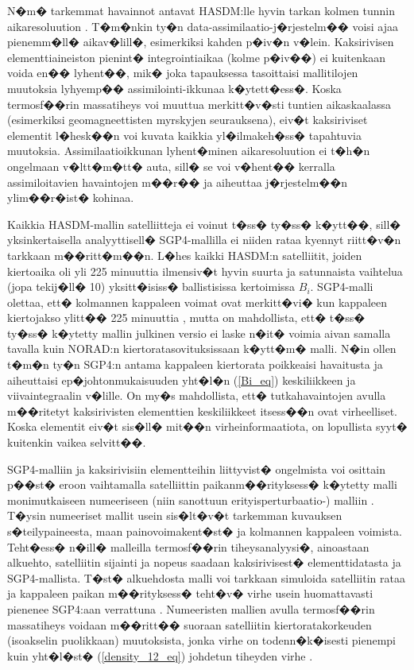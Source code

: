 \documentclass[12pt,a4paper,finnish,margin=2in]{article}
\begin{document}
N�m� tarkemmat havainnot antavat HASDM:lle hyvin tarkan kolmen tunnin aikaresoluution \citep{storz_2005}. T�m�nkin ty�n data-assimilaatio-j�rjestelm�� voisi ajaa pienemm�ll� aikav�lill�, esimerkiksi kahden p�iv�n v�lein. Kaksirivisen elementtiaineiston pienint� integrointiaikaa (kolme p�iv��) ei kuitenkaan voida en�� lyhent��, mik� joka tapauksessa tasoittaisi mallitilojen muutoksia lyhyemp�� assimilointi-ikkunaa k�ytett�ess�. Koska termosf��rin massatiheys voi muuttua merkitt�v�sti tuntien aikaskaalassa (esimerkiksi geomagneettisten myrskyjen seurauksena), eiv�t kaksiriviset elementit l�hesk��n voi kuvata kaikkia yl�ilmakeh�ss� tapahtuvia muutoksia. Assimilaatioikkunan lyhent�minen aikaresoluution ei t�h�n ongelmaan v�ltt�m�tt� auta, sill� se voi v�hent�� kerralla assimiloitavien havaintojen m��r�� ja aiheuttaa j�rjestelm��n ylim��r�ist� kohinaa.

Kaikkia HASDM-mallin satelliitteja ei voinut t�ss� ty�ss� k�ytt��, sill� yksinkertaisella analyyttisell� SGP4-mallilla ei niiden rataa kyennyt riitt�v�n tarkkaan m��ritt�m��n. L�hes kaikki HASDM:n satelliitit, joiden kiertoaika oli yli 225 minuuttia ilmensiv�t hyvin suurta ja satunnaista vaihtelua (jopa tekij�ll� 10) yksitt�isiss� ballistisissa kertoimissa $B_i$. SGP4-malli olettaa, ett� kolmannen kappaleen voimat ovat merkitt�vi� kun kappaleen kiertojakso ylitt�� 225 minuuttia \citep{hoots_1980}, mutta on mahdollista, ett� t�ss� ty�ss� k�ytetty mallin julkinen versio ei laske n�it� voimia aivan samalla tavalla kuin NORAD:n kiertoratasovituksissaan k�ytt�m� malli. N�in ollen t�m�n ty�n SGP4:n antama kappaleen kiertorata poikkeaisi havaitusta ja aiheuttaisi ep�johtonmukaisuuden yht�l�n (\ref{Bi_eq}) keskiliikkeen ja viivaintegraalin v�lille. On my�s mahdollista, ett� tutkahavaintojen avulla m��ritetyt kaksirivisten elementtien keskiliikkeet itsess��n ovat virheelliset. Koska elementit eiv�t sis�ll� mit��n virheinformaatiota, on lopullista syyt� kuitenkin vaikea selvitt��. 

SGP4-malliin ja kaksirivisiin elementteihin liittyvist� ongelmista voi osittain p��st� eroon vaihtamalla satelliittin paikanm��rityksess� k�ytetty malli monimutkaiseen numeeriseen (niin sanottuun erityisperturbaatio-) malliin \citep{picone_2005}. T�ysin numeeriset mallit usein sis�lt�v�t tarkemman kuvauksen s�teilypaineesta, maan painovoimakent�st� ja kolmannen kappaleen voimista. Teht�ess� n�ill� malleilla termosf��rin tiheysanalyysi�, ainoastaan alkuehto, satelliitin sijainti ja nopeus saadaan kaksirivisest� elementtidatasta ja SGP4-mallista. T�st� alkuehdosta malli voi tarkkaan simuloida satelliitin rataa ja kappaleen paikan m��rityksess� teht�v� virhe usein huomattavasti pienenee SGP4:aan verrattuna \citep{saunders_2011}. Numeeristen mallien avulla termosf��rin massatiheys voidaan m��ritt�� suoraan satelliitin kiertoratakorkeuden (isoakselin puolikkaan) muutoksista, jonka virhe on todenn�k�isesti pienempi kuin yht�l�st� (\ref{density_12_eq}) johdetun tiheyden virhe \citep{saunders_2011}. 
\end{document}
